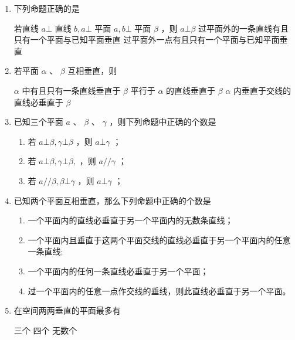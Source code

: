\begin{enumerate}




\item 下列命题正确的是

{若直线 $ a \bot $ 直线 $ b,a \bot $ 平面 $ a,b \bot $ 平面 $ \beta $ ，则 $ a \bot  \beta $}
{过平面外的一条直线有且只有一个平面与已知平面垂直}
{过平面外一点有且只有一个平面与已知平面垂直}

\item 若平面 $ \alpha $ 、 $ \beta $ 互相垂直，则 

{$ \alpha $ 中有且只有一条直线垂直于 $ \beta $}
{平行于 $ \alpha $ 的直线垂直于 $ \beta $} 
{$ \alpha $ 内垂直于交线的直线必垂直于 $ \beta $}


\item 已知三个平面 $ a $ 、 $ \beta $ 、 $ \gamma $ ，则下列命题中正确的个数是 
\begin{enumerate}

\item 若 $ a \bot  \beta ,\gamma  \bot  \beta $ ，则 $ a \bot  \gamma $ ；
\item 若 $ a \bot  \beta ,\gamma  \bot  \beta , $ ，则 $ a//\gamma $ ；
\item 若 $ a//\beta ,\beta  \bot  \gamma $ ，则 $ a \bot  \gamma $ ；
    
\end{enumerate}

\item 已知两个平面互相垂直，那么下列命题中正确的个数是 
\begin{enumerate}

\item 一个平面内的直线必垂直于另一个平面内的无数条直线；

\item 一个平面内且垂直于这两个平面交线的直线必垂直于另一个平面内的任意一条直线;

\item 一个平面内的任何一条直线必垂直于另一个平面；

\item 过一个平面内的任意一点作交线的垂线，则此直线必垂直于另一个平面。
\end{enumerate}


\item 在空间两两垂直的平面最多有

 {三个} {四个} {无数个}



\end{enumerate}


